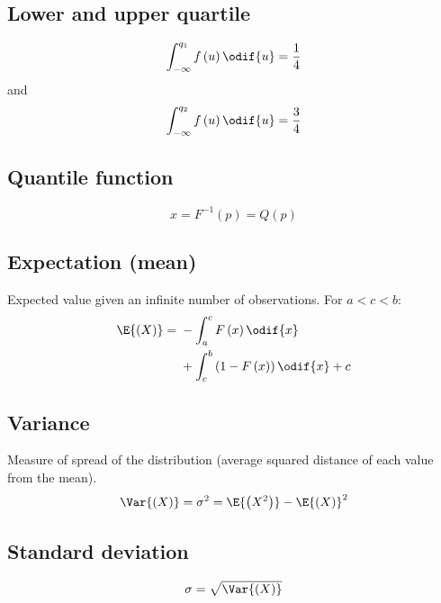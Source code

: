 \documentclass{article}
\begin{document}
\begin{minipage}{126.1962963mm}
\begin{multicols}{2}
        \subsection{Lower and upper quartile}
        \begin{equation*}
            \int_{-\infty}^{q_1} f\left( u \right) \odif{u} = \frac{1}{4}
        \end{equation*}
        and
        \begin{equation*}
            \int_{-\infty}^{q_2} f\left( u \right) \odif{u} = \frac{3}{4}
        \end{equation*}
        \subsection{Quantile function}
        \begin{equation*}
            x = F^{-1}\left( p \right) = Q\left( p \right)
        \end{equation*}
        \subsection{Expectation (mean)}
        Expected value given an infinite number of observations. For \(a < c < b\):
        \begin{equation*}
            \E{\left(X\right)} = \begin{aligned}[t]
                 & -\int_{a}^c F\left( x \right) \odif{x}                     \\
                 & + \int_c^b \left(1 - F\left( x \right)\right) \odif{x} + c
            \end{aligned}
        \end{equation*}
        \subsection{Variance}
        Measure of spread of the distribution (average squared distance of each value from the mean).
        \begin{equation*}
            \Var{\left( X \right)} = \sigma^2 = \E{\left( X^2 \right)} - \E{\left( X \right)}^2
        \end{equation*}
        \subsection{Standard deviation}
        \begin{equation*}
            \sigma = \sqrt{\Var{\left( X \right)}}
        \end{equation*}
    \end{multicols}
\end{minipage}\hfill%
\end{document}
